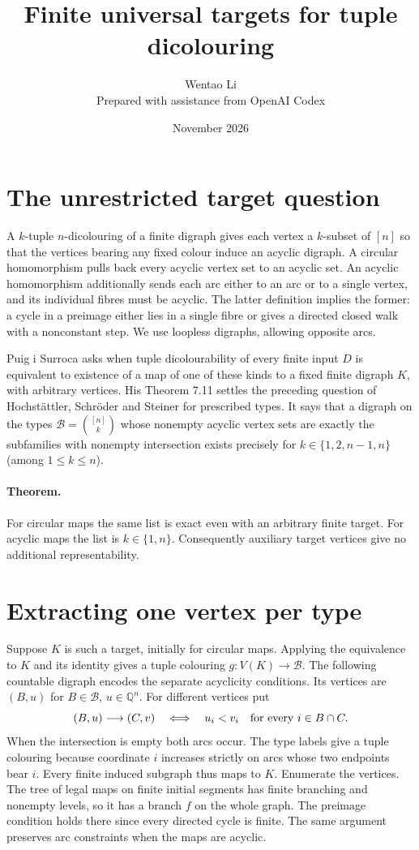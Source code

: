 \documentclass[11pt]{article}
\title{Finite universal targets for tuple dicolouring}
\author{Wentao Li\\[2pt]\small Prepared with assistance from OpenAI Codex}
\date{November 2026}
\begin{document}
\maketitle
\section{The unrestricted target question}
A $k$-tuple $n$-dicolouring of a finite digraph gives each vertex a $k$-subset of $[n]$ so that the vertices bearing any fixed colour induce an acyclic digraph. A circular homomorphism pulls back every acyclic vertex set to an acyclic set. An acyclic homomorphism additionally sends each arc either to an arc or to a single vertex, and its individual fibres must be acyclic. The latter definition implies the former: a cycle in a preimage either lies in a single fibre or gives a directed closed walk with a nonconstant step. We use loopless digraphs, allowing opposite arcs.

Puig i Surroca \cite[Problem 7.14]{gil} asks when tuple dicolourability of every finite input $D$ is equivalent to existence of a map of one of these kinds to a fixed finite digraph $K$, with arbitrary vertices. His Theorem 7.11 settles the preceding question of Hochst\"attler, Schr\"oder and Steiner \cite{hss} for prescribed types. It says that a digraph on the types $\mathcal B=\binom{[n]}k$ whose nonempty acyclic vertex sets are exactly the subfamilies with nonempty intersection exists precisely for $k\in\{1,2,n-1,n\}$ (among $1\le k\le n$).

\paragraph{Theorem.} For circular maps the same list is exact even with an arbitrary finite target. For acyclic maps the list is $k\in\{1,n\}$. Consequently auxiliary target vertices give no additional representability.

\section{Extracting one vertex per type}
Suppose $K$ is such a target, initially for circular maps. Applying the equivalence to $K$ and its identity gives a tuple colouring $g:V(K)\to\mathcal B$. The following countable digraph encodes the separate acyclicity conditions. Its vertices are $(B,u)$ for $B\in\mathcal B$, $u\in\mathbb Q^n$. For different vertices put
\[
 (B,u)\longrightarrow(C,v)
 \quad\Longleftrightarrow\quad u_i<v_i\quad\hbox{for every }i\in B\cap C .
\]
When the intersection is empty both arcs occur. The type labels give a tuple colouring because coordinate $i$ increases strictly on arcs whose two endpoints bear $i$. Every finite induced subgraph thus maps to $K$. Enumerate the vertices. The tree of legal maps on finite initial segments has finite branching and nonempty levels, so it has a branch $f$ on the whole graph. The preimage condition holds there since every directed cycle is finite. The same argument preserves arc constraints when the maps are acyclic.
\end{document}
